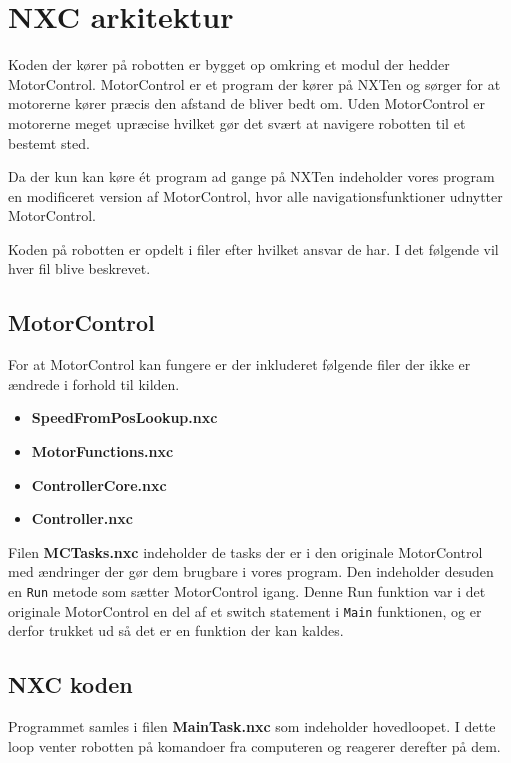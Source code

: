 \section{NXC arkitektur}
Koden der kører på robotten er bygget op omkring et modul der hedder MotorControl. \cite{MotorControl}
MotorControl er et program der kører på NXTen og sørger for at motorerne kører præcis den afstand de bliver bedt om. 
Uden MotorControl er motorerne meget upræcise hvilket gør det svært at navigere robotten til et bestemt sted.

Da der kun kan køre ét program ad gange på NXTen indeholder vores program en modificeret version af MotorControl, hvor alle navigationsfunktioner udnytter MotorControl.

Koden på robotten er opdelt i filer efter hvilket ansvar de har.
I det følgende vil hver fil blive beskrevet.

\subsection{MotorControl}
For at MotorControl kan fungere er der inkluderet følgende filer der ikke er ændrede i forhold til kilden.

\begin{itemize}
\item \textbf{SpeedFromPosLookup.nxc}
\item \textbf{MotorFunctions.nxc}
\item \textbf{ControllerCore.nxc}
\item \textbf{Controller.nxc}
\end{itemize}

Filen \textbf{MCTasks.nxc} indeholder de tasks der er i den originale MotorControl med ændringer der gør dem brugbare i vores program.
Den indeholder desuden en \lstinline[style=c]!Run! metode som sætter MotorControl igang. 
Denne Run funktion var i det originale MotorControl en del af et switch statement i \lstinline[style=c]!Main! funktionen, og er derfor trukket ud så det er en funktion der kan kaldes.

\subsection{NXC koden}

Programmet samles i filen \textbf{MainTask.nxc} som indeholder hovedloopet. 
I dette loop venter robotten på komandoer fra computeren og reagerer derefter på dem.

